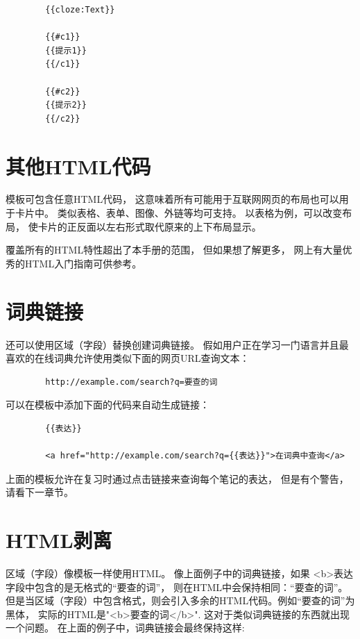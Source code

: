 \documentclass[a4paper]{book}
\begin{document}
	\begin{shaded}\begin{verbatim}
		{{cloze:Text}}
		
		{{#c1}}
		{{提示1}}
		{{/c1}}
		
		{{#c2}}
		{{提示2}}
		{{/c2}}
		\end{verbatim}\end{shaded}
	\section{其他HTML代码}
	模板可包含任意HTML代码， 这意味着所有可能用于互联网网页的布局也可以用于卡片中。 类似表格、表单、图像、外链等均可支持。 以表格为例，可以改变布局， 使卡片的正反面以左右形式取代原来的上下布局显示。
	
	覆盖所有的HTML特性超出了本手册的范围， 但如果想了解更多， 网上有大量优秀的HTML入门指南可供参考。
	
	\section{词典链接}
	还可以使用区域（字段）替换创建词典链接。 假如用户正在学习一门语言并且最喜欢的在线词典允许使用类似下面的网页URL查询文本：
	
	\begin{shaded}\begin{verbatim}
		http://example.com/search?q=要查的词
		\end{verbatim}\end{shaded}
	可以在模板中添加下面的代码来自动生成链接：
	\begin{shaded}\begin{verbatim}
		{{表达}}
		
		<a href="http://example.com/search?q={{表达}}">在词典中查询</a>
		\end{verbatim}\end{shaded}
	上面的模板允许在复习时通过点击链接来查询每个笔记的表达， 但是有个警告， 请看下一章节。
	
	\section{HTML剥离}
	区域（字段）像模板一样使用HTML。 像上面例子中的词典链接，如果
	<b>表达字段中包含的是无格式的“要查的词”， 则在HTML中会保持相同：“要查的词”。 但是当区域（字段）中包含格式，则会引入多余的HTML代码。例如“要查的词”为黑体， 实际的HTML是"<b>要查的词</b>".
	这对于类似词典链接的东西就出现一个问题。 在上面的例子中，词典链接会最终保持这样:
	
\end{document}
